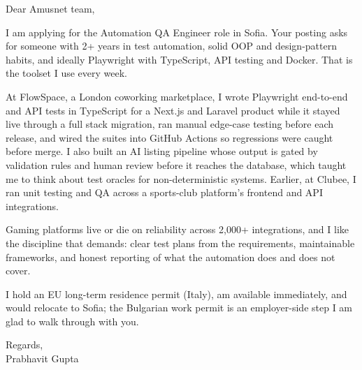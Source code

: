 \documentclass[a4paper,11pt]{article}
\begin{document}
Dear Amusnet team,

I am applying for the Automation QA Engineer role in Sofia. Your posting asks for someone with 2+ years in test automation, solid OOP and design-pattern habits, and ideally Playwright with TypeScript, API testing and Docker. That is the toolset I use every week.

At FlowSpace, a London coworking marketplace, I wrote Playwright end-to-end and API tests in TypeScript for a Next.js and Laravel product while it stayed live through a full stack migration, ran manual edge-case testing before each release, and wired the suites into GitHub Actions so regressions were caught before merge. I also built an AI listing pipeline whose output is gated by validation rules and human review before it reaches the database, which taught me to think about test oracles for non-deterministic systems. Earlier, at Clubee, I ran unit testing and QA across a sports-club platform's frontend and API integrations.

Gaming platforms live or die on reliability across 2,000+ integrations, and I like the discipline that demands: clear test plans from the requirements, maintainable frameworks, and honest reporting of what the automation does and does not cover.

I hold an EU long-term residence permit (Italy), am available immediately, and would relocate to Sofia; the Bulgarian work permit is an employer-side step I am glad to walk through with you.

Regards,\\
Prabhavit Gupta
\end{document}
